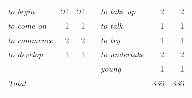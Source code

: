 \begin{table}
\begin{tabularx}{\textwidth}{>{\itshape}lrrX>{\itshape}lrr}
 to begin &  91 &  91                        & & to take up &  2 &  2\\
 to come on &  1 &  1                        & & to talk &  1 &  1\\
 to commence &  2 &  2                       & & to try &  1 &  1\\
 to develop &  1 &  1                        & & to undertake &  2 &  2\\
            &    &                           & & young &  1 &  1\\\midrule 
 \normalfont Total   &      &                &          &  &  336 &  336\\\lspbottomrule
\end{tabularx}                                 
\end{table}

